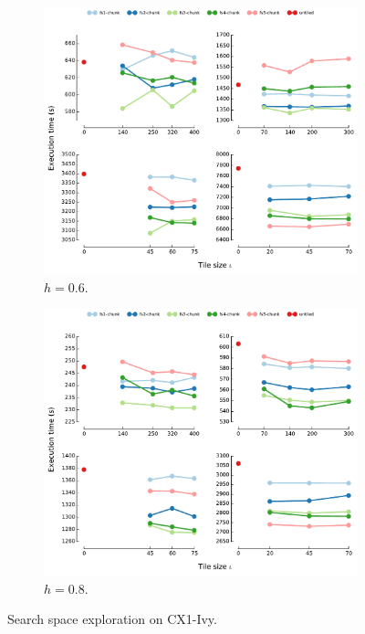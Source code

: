 \begin{figure}[htpb]
\begin{subfigure}[]{1\textwidth}
\includegraphics[scale=0.60]{sparsetiling/perf-eval/summary/grid_cx1-ivy_plexmesh_h06_mpi.pdf}
\caption{$h = 0.6$.}
\label{fig:st-cx1-expl-h06}
\end{subfigure}%
\par\bigskip
\par\medskip
\begin{subfigure}[]{1\textwidth}
\includegraphics[scale=0.60]{sparsetiling/perf-eval/summary/grid_cx1-ivy_plexmesh_h08_mpi.pdf}
\caption{$h = 0.8$.}
\label{fig:st-cx1-expl-h08}
\end{subfigure}%

\caption{Search space exploration on CX1-Ivy.}
\label{fig:st-cx1-expl}
\end{figure}


